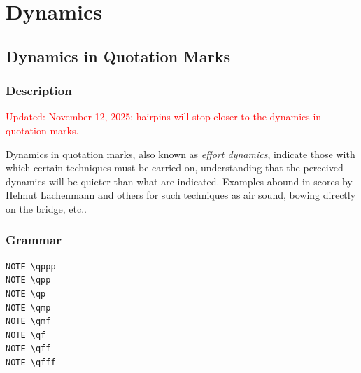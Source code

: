
\chapter {Dynamics}

\section {Dynamics in Quotation Marks}
\hfill
{}
\hfill

\subsection{Description}

\textcolor{red}{Updated: November 12, 2025: hairpins will stop closer to the dynamics in quotation marks.}

Dynamics in quotation marks, also known as \textit{effort dynamics}, indicate those with which certain techniques must be carried on, understanding that the perceived dynamics will be quieter than what are indicated. Examples abound in scores by Helmut Lachenmann and others for such techniques as air sound, bowing directly on the bridge, etc..

\subsection{Grammar}
\begin{verbatim}
NOTE \qppp
NOTE \qpp
NOTE \qp
NOTE \qmp
NOTE \qmf
NOTE \qf
NOTE \qff
NOTE \qfff
\end{verbatim}

